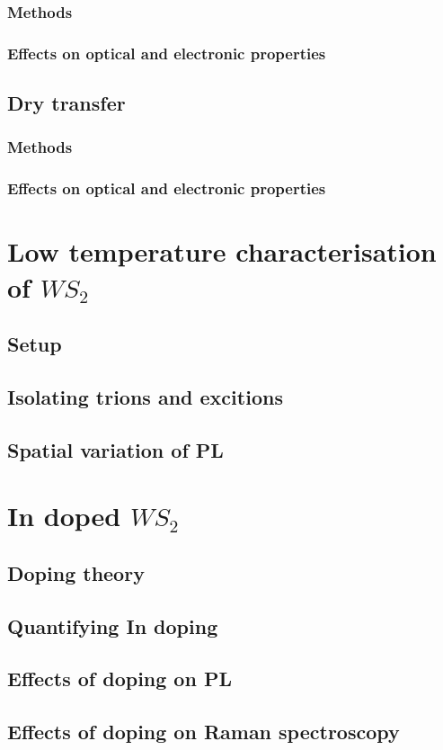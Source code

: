 \documentclass[12pt]{article}
\begin{document}
		\subsubsection{Methods}
		\subsubsection{Effects on optical and electronic properties}
	\subsection{Dry transfer}
		\subsubsection{Methods}
		\subsubsection{Effects on optical and electronic properties}
\section{Low temperature characterisation of $WS_2$}
	\subsection{Setup}
	\subsection{Isolating trions and excitions}
	\subsection{Spatial variation of PL}
\section{In doped $WS_2$}
	\subsection{Doping theory}
	\subsection{Quantifying In doping}
	\subsection{Effects of doping on PL}
	\subsection{Effects of doping on Raman spectroscopy}
\end{document}
